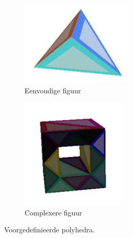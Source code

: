 \begin{figure}
	\centering
	\begin{subfigure}{.5\textwidth}
		\centering
		\includegraphics[width=.4\linewidth]{4point.png} %
		\caption{Eenvoudige figuur}
		\label{fig:sub1}
	\end{subfigure}%
	\begin{subfigure}{.5\textwidth}
		\centering
		\includegraphics[width=.4\linewidth]{hollowcube.png} %
		\caption{Complexere figuur}
		\label{fig:sub2}
	\end{subfigure}
	\caption{Voorgedefinieerde polyhedra.}
	\label{fig:test}
\end{figure}

